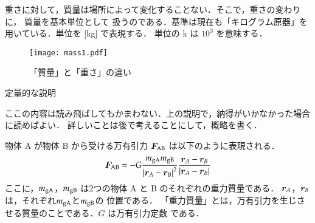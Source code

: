             重さに対して，質量は場所によって変化することない．そこで，重さの変わりに，
            質量を基本単位として
            扱うのである．基準は現在も「キログラム原器」を用いている．単位を [kg] で表現する．
            単位の k は $10^{3}$ を意味する．
            \begin{figure}[hbt]
                \begin{center}
                    \texttt{[image: mass1.pdf]}
                    \caption{「質量」と「重さ」の違い}
                    \label{fig:mass1}
                \end{center}
            \end{figure}


            \begin{memo}{定量的な説明}
            \begin{mycomment}
            ここの内容は読み飛ばしてもかまわない．上の説明で，納得がいかなかった場合に読めばよい．
            詳しいことは後で考えることにして，概略を書く．
            \end{mycomment}

            物体 A が物体 B から受ける万有引力 $\boldsymbol{F}_{\mathrm{AB}}$ は以下のように表現される．
                    \begin{align}\label{AA}
                        \bF_{\rm{AB}}
                        = -G\frac{m_{\rm{gA}}m_{\rm{gB}}}{{\left| \br_{A}
                        -\br_{B} \right|}^{2}}
                        \frac{\br_{A}-\br_{B}}{\left| \br_{A}
                        -\br_{B} \right|}
                    \end{align}
            ここに，$m_{\rm{gA}}$，$m_{\rm{gB}}$ は2つの物体 A と B のそれぞれの重力質量である．
            $\boldsymbol{r}_{A}$，$\boldsymbol{r}_{B}$は，それぞれ$m_{\rm{gA}}$と$m_{\rm{gB}}$の
            位置である．
            「重力質量」とは，万有引力を生じさせる質量のことである．$G$ は万有引力定数
            である．


\end{memo}
